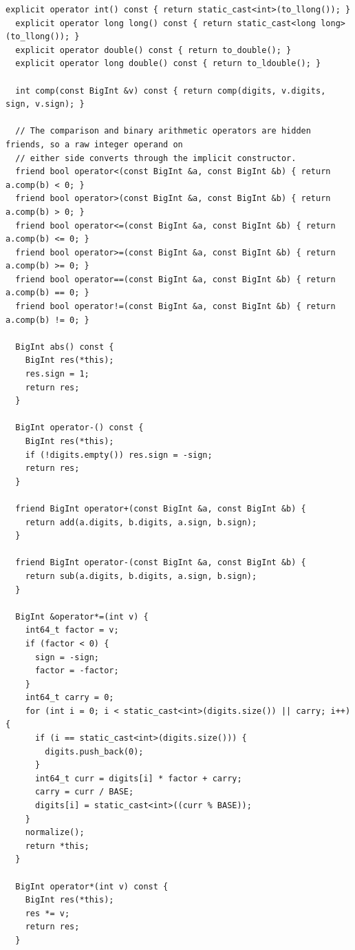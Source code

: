 \begin{lstlisting}[style=cpp]
  explicit operator int() const { return static_cast<int>(to_llong()); }
  explicit operator long long() const { return static_cast<long long>(to_llong()); }
  explicit operator double() const { return to_double(); }
  explicit operator long double() const { return to_ldouble(); }

  int comp(const BigInt &v) const { return comp(digits, v.digits, sign, v.sign); }

  // The comparison and binary arithmetic operators are hidden friends, so a raw integer operand on
  // either side converts through the implicit constructor.
  friend bool operator<(const BigInt &a, const BigInt &b) { return a.comp(b) < 0; }
  friend bool operator>(const BigInt &a, const BigInt &b) { return a.comp(b) > 0; }
  friend bool operator<=(const BigInt &a, const BigInt &b) { return a.comp(b) <= 0; }
  friend bool operator>=(const BigInt &a, const BigInt &b) { return a.comp(b) >= 0; }
  friend bool operator==(const BigInt &a, const BigInt &b) { return a.comp(b) == 0; }
  friend bool operator!=(const BigInt &a, const BigInt &b) { return a.comp(b) != 0; }

  BigInt abs() const {
    BigInt res(*this);
    res.sign = 1;
    return res;
  }

  BigInt operator-() const {
    BigInt res(*this);
    if (!digits.empty()) res.sign = -sign;
    return res;
  }

  friend BigInt operator+(const BigInt &a, const BigInt &b) {
    return add(a.digits, b.digits, a.sign, b.sign);
  }

  friend BigInt operator-(const BigInt &a, const BigInt &b) {
    return sub(a.digits, b.digits, a.sign, b.sign);
  }

  BigInt &operator*=(int v) {
    int64_t factor = v;
    if (factor < 0) {
      sign = -sign;
      factor = -factor;
    }
    int64_t carry = 0;
    for (int i = 0; i < static_cast<int>(digits.size()) || carry; i++) {
      if (i == static_cast<int>(digits.size())) {
        digits.push_back(0);
      }
      int64_t curr = digits[i] * factor + carry;
      carry = curr / BASE;
      digits[i] = static_cast<int>((curr % BASE));
    }
    normalize();
    return *this;
  }

  BigInt operator*(int v) const {
    BigInt res(*this);
    res *= v;
    return res;
  }


\end{lstlisting}
